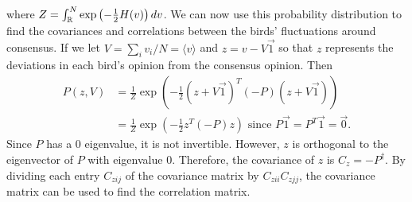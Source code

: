 \documentclass{article}
\begin{document}
where $Z=\int_{\mathbb{R}}^N\exp\left(-\frac{1}{2}H(v)\right)dv$. We can now use this probability distribution to find the  covariances and correlations between the birds' fluctuations around consensus.  If we let $V=\sum_iv_i/N=\langle v\rangle$ and $z=v-V\vec{1}$ so that $z$ represents the deviations in each bird's opinion from the consensus opinion. Then 
\begin{align*}
P(z,V)&=\frac{1}{Z}\exp\left(-\frac{1}{2}(z+V\vec{1})^T(-P)(z+V\vec{1})\right)
\\&=\frac{1}{Z}\exp\left(-\frac{1}{2}z^T(-P)z\right) \text{ since }P\vec{1}=P^T\vec{1}=\vec{0}.
\end{align*}
Since $P$ has a $0$ eigenvalue, it is not invertible. However, $z$ is orthogonal to the eigenvector of $P$ with eigenvalue $0$. Therefore, the covariance of $z$ is $C_z=-P^\dagger$.
By dividing each entry $C_{zij}$ of the covariance matrix by $C_{zii}C_{zjj}$, the covariance matrix can be used to find the correlation matrix.
\end{document}
